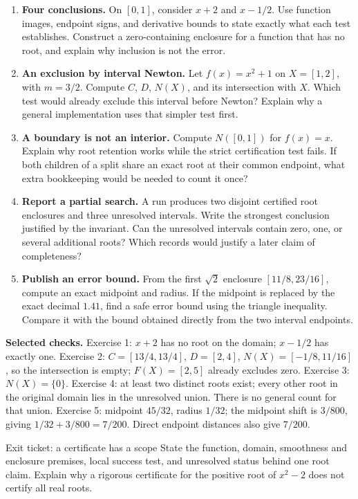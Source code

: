 \begin{enumerate}
\item \textbf{Four conclusions.} On $[0,1]$, consider $x+2$ and $x-1/2$.
Use function images, endpoint signs, and derivative bounds to state exactly
what each test establishes. Construct a zero-containing enclosure for a
function that has no root, and explain why inclusion is not the error.

\item \textbf{An exclusion by interval Newton.} Let $f(x)=x^2+1$ on
$X=[1,2]$, with $m=3/2$. Compute $C$, $D$, $N(X)$, and its intersection
with $X$. Which test would already exclude this interval before Newton?
Explain why a general implementation uses that simpler test first.

\item \textbf{A boundary is not an interior.} Compute $N([0,1])$ for
$f(x)=x$. Explain why root retention works while the strict certification
test fails. If both children of a split share an exact root at their common
endpoint, what extra bookkeeping would be needed to count it once?

\item \textbf{Report a partial search.} A run produces two disjoint
certified root enclosures and three unresolved intervals. Write the strongest
conclusion justified by the invariant. Can the unresolved intervals contain
zero, one, or several additional roots? Which records would justify a later
claim of completeness?

\item \textbf{Publish an error bound.} From the first $\sqrt2$ enclosure
$[11/8,23/16]$, compute an exact midpoint and radius. If the midpoint is
replaced by the exact decimal $1.41$, find a safe error bound using the
triangle inequality. Compare it with the bound obtained directly from the
two interval endpoints.
\end{enumerate}

\textbf{Selected checks.} Exercise 1: $x+2$ has no root on the domain;
$x-1/2$ has exactly one. Exercise 2: $C=[13/4,13/4]$, $D=[2,4]$,
$N(X)=[-1/8,11/16]$, so the intersection is empty; $F(X)=[2,5]$ already
excludes zero. Exercise 3: $N(X)=\{0\}$. Exercise 4: at least two distinct
roots exist; every other root in the original domain lies in the unresolved
union. There is no general count for that union. Exercise 5: midpoint
$45/32$, radius $1/32$; the midpoint shift is $3/800$, giving
$1/32+3/800=7/200$. Direct endpoint distances also give $7/200$.

\begin{question}{Exit ticket: a certificate has a scope}
State the function, domain, smoothness and enclosure premises, local success
test, and unresolved status behind one root claim. Explain why a rigorous
certificate for the positive root of $x^2-2$ does not certify all real roots.
\end{question}


